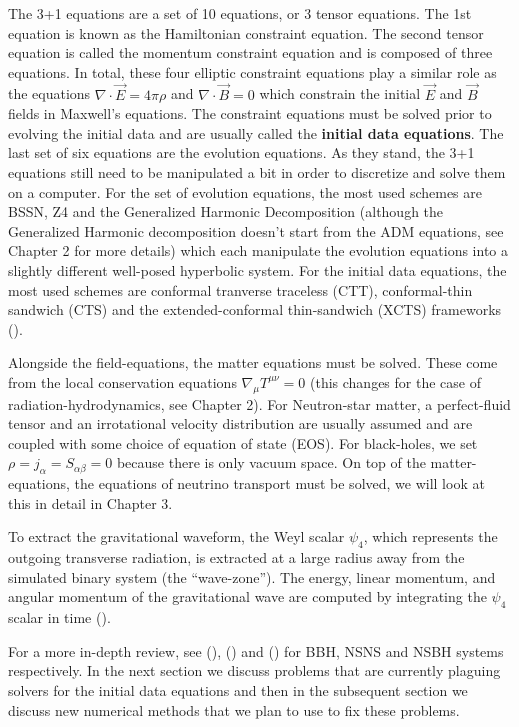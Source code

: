 The 3+1 equations are a set of 10 equations, or 3 tensor equations. The 1st equation is known as the Hamiltonian constraint equation. The second tensor equation is called the momentum constraint equation and is composed of three equations. In total, these four elliptic constraint equations play a similar role as the equations $\nabla \cdot \vec E = 4\pi\rho$ and $\nabla \cdot \vec B = 0$ which constrain the initial $\vec E$ and $\vec B$ fields in Maxwell's equations. The constraint equations must be solved prior to evolving the initial data and are usually called the \textbf{initial data equations}. The last set of six equations are the evolution equations. As they stand, the 3+1 equations still need to be manipulated a bit in order to discretize and solve them on a computer. For the set of evolution equations, the most used schemes are BSSN, Z4 and the Generalized Harmonic Decomposition (although the Generalized Harmonic decomposition doesn't start from the ADM equations, see Chapter 2 for more details) which each manipulate the evolution equations into a slightly different well-posed hyperbolic system. For the initial data equations, the most used schemes are conformal tranverse traceless (CTT), conformal-thin sandwich (CTS) and the extended-conformal thin-sandwich (XCTS) frameworks (\cite{pfeiffer-york:2005,alcubierre2012introduction,sopuerta2015gravitational}).

Alongside the field-equations, the matter equations must be solved. These come from the local conservation equations $\nabla_{\mu}T^{\mu\nu} = 0$ (this changes for the case of radiation-hydrodynamics, see Chapter 2). For Neutron-star matter, a perfect-fluid tensor and an irrotational velocity distribution are usually assumed and are coupled with some choice of equation of state (EOS). For black-holes, we set $\rho = j_{\alpha} = S_{\alpha\beta} = 0$ because there is only vacuum space. On top of the matter-equations, the equations of neutrino transport must be solved, we will look at this in detail in Chapter 3.

To extract the gravitational waveform, the Weyl scalar $\psi_{4}$, which represents the outgoing transverse radiation, is extracted at a large radius away from the simulated binary system (the ``wave-zone''). The energy, linear momentum, and angular momentum of the gravitational wave are computed by integrating the $\psi_{4}$ scalar in time (\cite{kyutoku2015dynamical}).

For a more in-depth review, see (\cite{sperhake2014numerical}), (\cite{faber2012binary}) and (\cite{shibata2011coalescence}) for BBH, NSNS and NSBH systems respectively. In the next section we discuss problems that are currently plaguing solvers for the initial data equations and then in the subsequent section we discuss new numerical methods that we plan to use to fix these problems.

